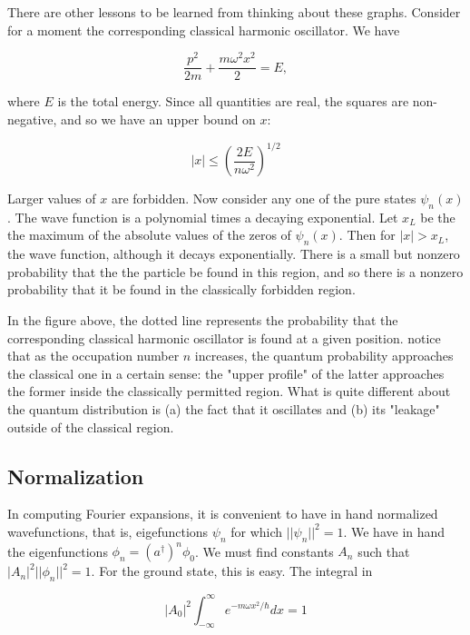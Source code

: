 There are other lessons to be learned from thinking about these graphs.  Consider for a moment the corresponding classical harmonic oscillator. 
We have

\begin{equation}
\frac{p^2}{2m} + \frac{m\omega^2 x^2}{2} = E,
\end{equation}

where $E$ is the total energy.  Since all quantities are real, the squares are non-negative, and so we have an upper bound on $x$:

\begin{equation}
|x| \le \left(\frac{2E}{ n\omega^2 }\right)^{1/2}
\end{equation}

Larger values of $x$ are forbidden.  Now consider any one of the pure states $\psi_n(x)$. The wave function is a polynomial times a decaying exponential.  Let $x_L$ be the the maximum of the absolute values of the zeros of $\psi_n(x)$.  Then for $|x| > x_L$, the wave function, although it decays exponentially.  There is a small but nonzero probability that the the particle be found in this region, and so there is a nonzero probability that it be found in the classically forbidden region.  

In the figure above, the dotted line represents the probability that the corresponding classical harmonic oscillator is found at a given position.  notice that as the occupation number $n$ increases, the quantum probability approaches the classical one in a certain sense: the "upper profile" of the latter approaches the former inside the classically permitted region.  What is quite different about the quantum distribution is (a) the fact that it oscillates and (b) its "leakage" outside of the classical region.


\subsection{Normalization}

In computing Fourier expansions, it is convenient to have in hand normalized wavefunctions, that is,  eigefunctions $\psi_n$ for which $||\psi_n||^2 = 1$. 
We have in hand the eigenfunctions $\phi_n = (a^\dagger )^n\phi_0$.  We must find constants $A_n$ such that $|A_n|^2||\phi_n||^2 = 1$.  For the ground state, this is easy.  The integral in 

\begin{equation}
|A_0|^2 \int_{-\infty}^\infty e^{-m\omega x^2/\hbar}dx = 1
\end{equation}

